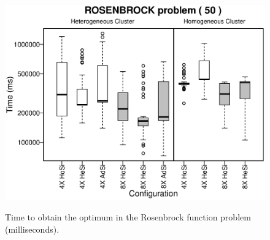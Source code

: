 \documentclass[final,1p,times]{elsarticle}
\begin{document}
\begin{figure}[ht]
{   \includegraphics[scale =0.5] {boxplots/ROSENBROCK_50_TIME.eps}
   \label{fig:50time}
 }
\caption{Time to obtain the optimum in the Rosenbrock function problem (milliseconds).}
\label{fig:timeROSENBROCK}
\end{figure}
\end{document}
